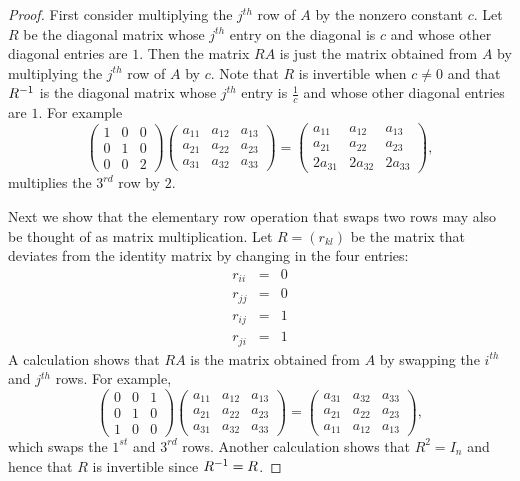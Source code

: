 \documentclass{ximera}
\begin{document}
\begin{proof}  First consider multiplying the $j^{th}$ row of $A$ by the
nonzero constant $c$.  Let $R$ be the diagonal matrix whose
$j^{th}$ entry on the diagonal is $c$ and whose other diagonal 
entries are $1$.  Then the matrix $RA$ is just the matrix obtained from 
$A$ by multiplying the $j^{th}$ row of $A$ by $c$.  Note that $R$ is
invertible when $c\neq 0$ and that $R^{-1}$ is the diagonal
matrix whose $j^{th}$ entry is $\frac{1}{c}$ and whose other
diagonal entries are $1$.  For example
\[
\left(\begin{array}{ccc} 1 & 0 & 0\\ 0 & 1 & 0 \\ 0 & 0 & 2\end{array}\right)
\left(\begin{array}{ccc} a_{11} & a_{12} & a_{13}\\ a_{21} & a_{22} & a_{23}
 \\ a_{31} & a_{32} & a_{33} \end{array}\right) =
\left(\begin{array}{ccc} a_{11} & a_{12} & a_{13}\\ a_{21} & a_{22} & a_{23}
 \\ 2a_{31} & 2a_{32} & 2a_{33} \end{array}\right),
\]
multiplies the $3^{rd}$ row by $2$.

Next we show that the elementary row operation that swaps two
rows may also be thought of as matrix multiplication.  Let
$R=(r_{kl})$ be the matrix that deviates from the identity matrix
by changing in the four entries:
\begin{eqnarray*}
r_{ii} & = & 0 \\
r_{jj} & = & 0\\
r_{ij} & = & 1 \\
r_{ji} & = & 1
\end{eqnarray*}
A calculation shows that $RA$ is the matrix obtained from $A$ by
swapping the $i^{th}$ and $j^{th}$ rows.  For example,
\[
\left(\begin{array}{ccc} 0 & 0 & 1\\ 0 & 1 & 0 \\ 1 & 0 & 0\end{array}\right)
\left(\begin{array}{ccc} a_{11} & a_{12} & a_{13}\\ a_{21} & a_{22} & a_{23}
 \\ a_{31} & a_{32} & a_{33} \end{array}\right) =
\left(\begin{array}{ccc} a_{31} & a_{32} & a_{33}\\ a_{21} & a_{22} & a_{23}
 \\  a_{11} & a_{12} & a_{13} \end{array}\right),
\]
which swaps the $1^{st}$ and $3^{rd}$ rows.  Another calculation
shows that $R^2=I_n$ and hence that $R$ is invertible since
$R^{-1}=R$.  


\end{proof}
\end{document}

